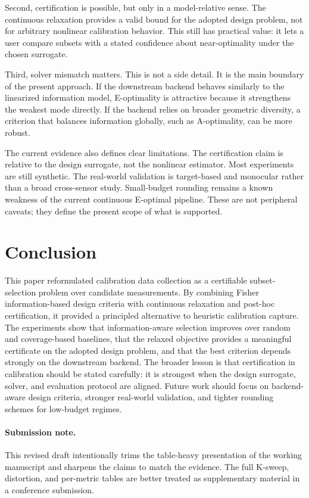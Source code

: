 \documentclass[11pt]{article}
\begin{document}
Second, certification is possible, but only in a model-relative sense. The
continuous relaxation provides a valid bound for the adopted design problem, not
for arbitrary nonlinear calibration behavior. This still has practical value:
it lets a user compare subsets with a stated confidence about near-optimality
under the chosen surrogate.

Third, solver mismatch matters. This is not a side detail. It is the main
boundary of the present approach. If the downstream backend behaves similarly to
the linearized information model, E-optimality is attractive because it
strengthens the weakest mode directly. If the backend relies on broader
geometric diversity, a criterion that balances information globally, such as
A-optimality, can be more robust.

The current evidence also defines clear limitations.
The certification claim is relative to the design surrogate, not the nonlinear
estimator. Most experiments are still synthetic. The real-world validation is
target-based and monocular rather than a broad cross-sensor study. Small-budget
rounding remains a known weakness of the current continuous E-optimal pipeline.
These are not peripheral caveats; they define the present scope of what is
supported.

\section{Conclusion}
This paper reformulated calibration data collection as a certifiable
subset-selection problem over candidate measurements. By combining Fisher
information-based design criteria with continuous relaxation and post-hoc
certification, it provided a principled alternative to heuristic calibration
capture. The experiments show that information-aware selection improves over
random and coverage-based baselines, that the relaxed objective provides a
meaningful certificate on the adopted design problem, and that the best
criterion depends strongly on the downstream backend. The broader lesson is
that certification in calibration should be stated carefully: it is strongest
when the design surrogate, solver, and evaluation protocol are aligned. Future
work should focus on backend-aware design criteria, stronger real-world
validation, and tighter rounding schemes for low-budget regimes.

\paragraph{Submission note.}
This revised draft intentionally trims the table-heavy presentation of the
working manuscript and sharpens the claims to match the evidence. The full
K-sweep, distortion, and per-metric tables are better treated as supplementary
material in a conference submission.

\printbibliography
\end{document}
